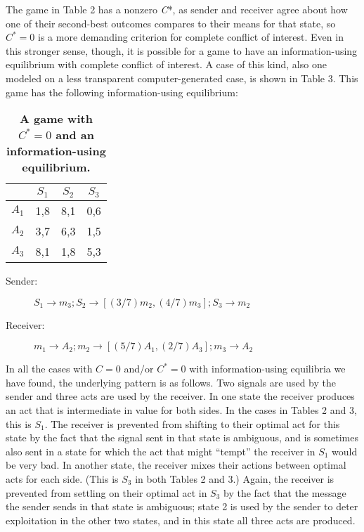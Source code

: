 \documentclass[10pt]{article}
\begin{document}
The game in Table 2 has a nonzero \emph{C}*, as sender and receiver
agree about how one of their second-best outcomes compares to their
means for that state, so $C^*=0$ is a more demanding criterion for
complete conflict of interest. Even in this stronger sense, though, it
is possible for a game to have an information-using equilibrium with
complete conflict of interest. A case of this kind, also one modeled on
a less transparent computer-generated case, is shown in Table 3. This
game has the following information-using equilibrium:

\begin{table}[!ht]
\caption{
\bf{A game with $C^*=0$ and an information-using equilibrium.}}
\begin{tabular}{|c||c|c|c|}
& $S_{1}$ & $S_{2}$ & $S_{3}$ \\
\hline
$A_{1}$ & 1,8 & 8,1 & 0,6 \\
$A_{2}$ & 3,7 & 6,3 & 1,5 \\
$A_{3}$ & 8,1 & 1,8 & 5,3 \\
\end{tabular}
\begin{flushleft}
\end{flushleft}
\label{tab:label}
 \end{table}

\begin{description}
\item[Sender:]
$S_1\rightarrow m_3; S_2\rightarrow [(3/7) m_2, (4/7) m_3]; S_3\rightarrow m_2$
\item[Receiver:]
$m_1\rightarrow A_2; m_2\rightarrow [(5/7)A_1, (2/7)A_3]; m_3\rightarrow A_2$
\end{description}

In all the cases with $C=0$ and/or $C^*=0$ with information-using
equilibria we have found, the underlying pattern is as follows. Two
signals are used by the sender and three acts are used by the receiver.
In one state the receiver produces an act that is intermediate in value
for both sides. In the cases in Tables 2 and 3, this is $S_1$. The receiver is
prevented from shifting to their optimal act for this state by the fact
that the signal sent in that state is ambiguous, and is sometimes also
sent in a state for which the act that might ``tempt'' the receiver in
$S_1$ would be very bad. In another state, the receiver mixes their actions
between optimal acts for each side. (This is $S_3$ in both Tables
2 and 3.) Again, the receiver is prevented from settling on their optimal act
in $S_3$ by the fact that the message the sender sends in that state is
ambiguous; state 2 is used by the sender to deter exploitation in the
other two states, and in this state all three acts are produced.
\end{document}
